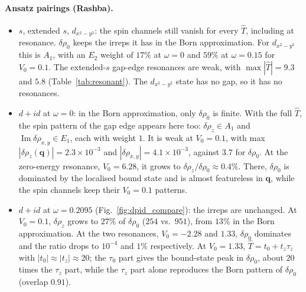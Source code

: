 \documentclass[aps,prb,twocolumn,superscriptaddress,nofootinbib]{revtex4-2}
\newcommand{\bq}{\bm{q}}
\begin{document}
\paragraph{Ansatz pairings (Rashba).}
\begin{itemize}
    \item $s$, extended $s$, $d_{x^2-y^2}$: the spin channels still vanish for every $\hat T$, including at resonance.
    $\delta\rho_0$ keeps the irreps it has in the Born approximation.
    For $d_{x^2-y^2}$ this is $A_1$, with an $E_2$ weight of $17\%$ at $\omega = 0$ and $59\%$ at $\omega = 0.15$ for $V_0 = 0.1$.
    The extended-$s$ gap-edge resonances are weak, with $\max|\hat T| = 9.3$ and $5.8$ (Table~\ref{tab:resonant}).
    The $d_{x^2-y^2}$ state has no gap, so it has no resonances.
    \item $d+id$ at $\omega = 0$: in the Born approximation, only $\delta\rho_0$ is finite.
    With the full $\hat T$, the spin pattern of the gap edge appears here too: $\delta\rho_z \in A_1$ and $\operatorname{Im}\delta\rho_{x,y} \in E_1$, each with weight $1$.
    It is weak at $V_0 = 0.1$, with max $|\delta\rho_z(\bq)| = 2.3\times10^{-3}$ and $|\delta\rho_{x,y}| = 4.1\times10^{-3}$, against $3.7$ for $\delta\rho_0$.
    At the zero-energy resonance, $V_0 = 6.28$, it grows to $\delta\rho_z/\delta\rho_0 \approx 0.4\%$.
    There, $\delta\rho_0$ is dominated by the localised bound state and is almost featureless in $\bq$, while the spin channels keep their $V_0 = 0.1$ patterns.
    \item $d+id$ at $\omega = 0.2095$ (Fig.~\ref{fig:dpid_compare}): the irreps are unchanged.
    At $V_0 = 0.1$, $\delta\rho_z$ grows to $27\%$ of $\delta\rho_0$ ($254$ vs.\ $951$), from $13\%$ in the Born approximation.
    At the two resonances, $V_0 = -2.28$ and $1.33$, $\delta\rho_0$ dominates and the ratio drops to $10^{-4}$ and $1\%$ respectively.
    At $V_0 = 1.33$, $\hat T = t_0 + t_z \tau_z$ with $|t_0| \approx |t_z| \approx 20$; the $\tau_0$ part gives the bound-state peak in $\delta\rho_0$, about $20$ times the $\tau_z$ part, while the $\tau_z$ part alone reproduces the Born pattern of $\delta\rho_0$ (overlap $0.91$).
\end{itemize}
\end{document}
